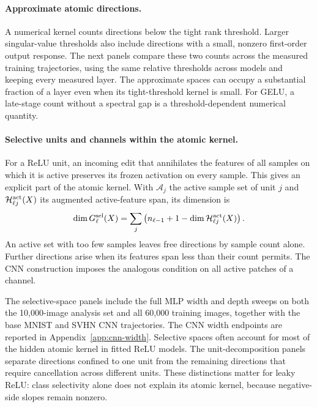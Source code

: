 \paragraph{Approximate atomic directions.}
A numerical kernel counts directions below the tight rank threshold. Larger singular-value thresholds also include directions with a small, nonzero first-order output response. The next panels compare these two counts across the measured training trajectories, using the same relative thresholds across models and keeping every measured layer. The approximate spaces can occupy a substantial fraction of a layer even when its tight-threshold kernel is small. For GELU, a late-stage count without a spectral gap is a threshold-dependent numerical quantity.



\paragraph{Selective units and channels within the atomic kernel.}
For a ReLU unit, an incoming edit that annihilates the features of all samples on which it is active preserves its frozen activation on every sample. This gives an explicit part of the atomic kernel. With $\mathcal A_j$ the active sample set of unit $j$ and $\mathcal H_{\ell j}^{\rm act}(X)$ its augmented active-feature span, its dimension is
\[
 \dim G_\ell^{\rm sel}(X)
 =\sum_j\left(n_{\ell-1}+1-\dim\mathcal H_{\ell j}^{\rm act}(X)\right).
\]
An active set with too few samples leaves free directions by sample count alone. Further directions arise when its features span less than their count permits. The CNN construction imposes the analogous condition on all active patches of a channel.

The selective-space panels include the full MLP width and depth sweeps on both the 10,000-image analysis set and all 60,000 training images, together with the base MNIST and SVHN CNN trajectories. The CNN width endpoints are reported in Appendix~\ref{app:cnn-width}. Selective spaces often account for most of the hidden atomic kernel in fitted ReLU models. The unit-decomposition panels separate directions confined to one unit from the remaining directions that require cancellation across different units. These distinctions matter for leaky ReLU: class selectivity alone does not explain its atomic kernel, because negative-side slopes remain nonzero.




